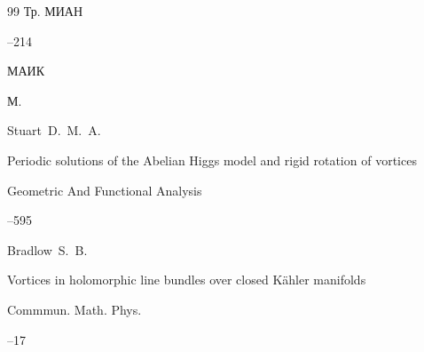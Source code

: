 \begin{thebibliography}{99}
\serial Тр. МИАН



--214

\publ МАИК

\publaddr М.














\by Stuart~D.~M.~A.  

\paper Periodic solutions of the Abelian Higgs model and rigid rotation of vortices 

\jour Geometric And Functional Analysis




--595









\by Bradlow~S.~B. 

\paper Vortices in holomorphic line bundles over closed K\"ahler manifolds 

\jour Commmun. Math. Phys. 




--17





\end{thebibliography}
